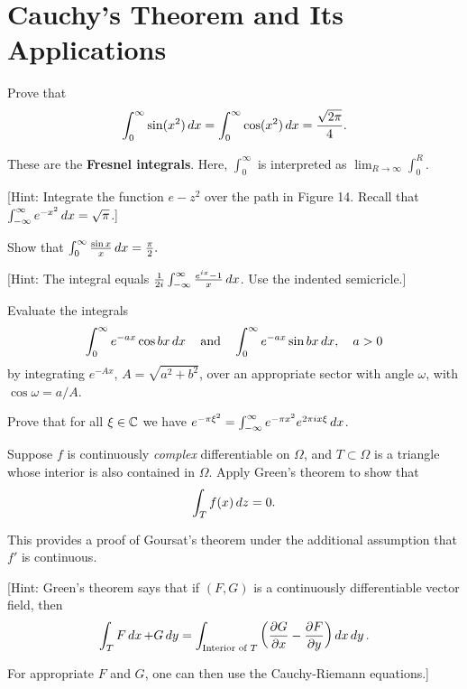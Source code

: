 \section{Cauchy's Theorem and Its Applications}

\begin{exercise}
Prove that $$\int_0^\infty \sin(x^2)\mathop{d{x}} = \int_0^\infty \cos(x^2) \mathop{d{x}} = \frac{\sqrt{2\pi}}{4}.$$

These are the \textbf{Fresnel integrals}. Here, $\int_0^\infty$ is interpreted as $\lim_{R\to\infty}\int_0^R$.

[Hint: Integrate the function $e-z^2$ over the path in Figure 14. Recall that $\int_{-\infty}^\infty e^{-x^2}\mathop{d{x}}=\sqrt{\pi}$.]
\end{exercise}


\begin{exercise}
Show that $\int_0^\infty\frac{\sin{x}}{x}\mathop{d{x}} = \frac{\pi}{2}.$

[Hint: The integral equals $\frac{1}{2i}\int_{-\infty}^\infty \frac{e^{ix}-1}{x}\mathop{d{x}}$. Use the indented semicricle.]
\end{exercise}

\begin{exercise}
Evaluate the integrals $$\int_0^\infty e^{-ax}\cos{bx}\mathop{d{x}} \quad \text{and} \quad \int_0^\infty e^{-ax}\sin{bx}\mathop{d{x}}, \quad a>0$$ by integrating $e^{-Ax}$, $A = \sqrt{a^2+b^2}$, over an appropriate sector with angle $\omega$, with $\cos{\omega}=a/A$.
\end{exercise}

\begin{exercise}
Prove that for all $\xi\in\mathbb{C}$ we have $e^{-\pi\xi^2}=\int_{-\infty}^\infty e^{-\pi x^2}e^{2\pi ix\xi}\mathop{d{x}}$.
\end{exercise}

\begin{exercise}
Suppose $f$ is continuously \textit{complex} differentiable on $\Omega$, and $T\subset\Omega$ is a triangle whose interior is also contained in $\Omega$. Apply Green's theorem to show that $$\int_T f(x)\mathop{d{z}}=0.$$

This provides a proof of Goursat's theorem under the additional assumption that $f'$ is continuous.

[Hint: Green's theorem says that if $(F, G)$ is a continuously differentiable vector
field, then $$\int_T F\mathop{d{x}} + G\mathop{d{y}} = \int_{\text{Interior of }T} \left(\frac{\mathop{\partial{G}}}{\mathop{\partial{x}}}-\frac{\mathop{\partial{F}}}{\mathop{\partial{y}}}\right)\mathop{d{x}}\mathop{d{y}}.$$

For appropriate $F$ and $G$, one can then use the Cauchy-Riemann equations.]
\end{exercise}

